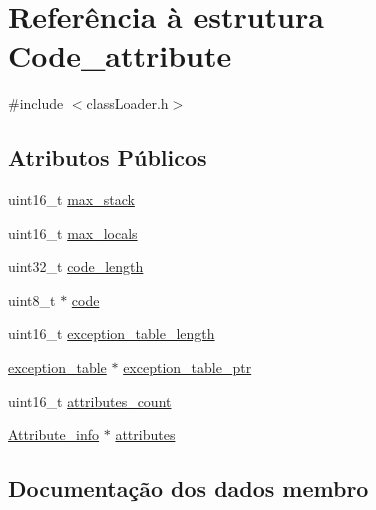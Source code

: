 \hypertarget{struct_code__attribute}{}\section{Referência à estrutura Code\+\_\+attribute}
\label{struct_code__attribute}


{\ttfamily \#include $<$class\+Loader.\+h$>$}

\subsection*{Atributos Públicos}
\begin{DoxyCompactItemize}
\item 
uint16\+\_\+t \hyperlink{struct_code__attribute_a48a438e661b3dd97b10a3dd59936da99}{max\+\_\+stack}
\item 
uint16\+\_\+t \hyperlink{struct_code__attribute_a0a71ae93e4baacd4ef38848fec7a60d7}{max\+\_\+locals}
\item 
uint32\+\_\+t \hyperlink{struct_code__attribute_a0ce11f0112ca510588549aa7c9f0866c}{code\+\_\+length}
\item 
uint8\+\_\+t $\ast$ \hyperlink{struct_code__attribute_aac89489ffa8b8e2832e7f4b8097c7454}{code}
\item 
uint16\+\_\+t \hyperlink{struct_code__attribute_a5ca80b8b400a20e11cbbbfa1af39fd3c}{exception\+\_\+table\+\_\+length}
\item 
\hyperlink{structexception__table}{exception\+\_\+table} $\ast$ \hyperlink{struct_code__attribute_af5c8031eb2ccf44c7684e4cb02169f14}{exception\+\_\+table\+\_\+ptr}
\item 
uint16\+\_\+t \hyperlink{struct_code__attribute_a427831d5d25cf89493a6c31ac1eb5f6c}{attributes\+\_\+count}
\item 
\hyperlink{struct_attribute__info}{Attribute\+\_\+info} $\ast$ \hyperlink{struct_code__attribute_ad42c1c926ade7cce485bed5e59184049}{attributes}
\end{DoxyCompactItemize}


\subsection{Documentação dos dados membro}
\hypertarget{struct_code__attribute_ad42c1c926ade7cce485bed5e59184049}{}\label{struct_code__attribute_ad42c1c926ade7cce485bed5e59184049} 
